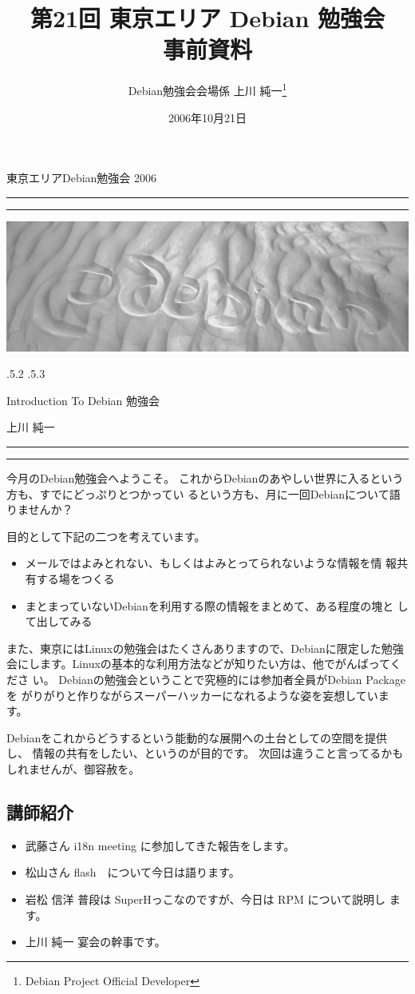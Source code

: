 \documentclass[mingoth,a4paper]{jsarticle}
\makeatletter
\renewcommand{\section}{\@startsection{section}{1}{\z@}%
    {\Cvs \@plus.5\Cdp \@minus.2\Cdp}%
    {.5\Cvs \@plus.3\Cdp}%
    {\normalfont\Huge\headfont\raggedright\centering}} %
\newcommand{\dancersection}[2]{%
\newpage
東京エリアDebian勉強会 2006
\hrule
\vspace{0.5mm}
\hrule
\hfill{}\includegraphics[width=16cm]{image2006-natsu/guruguru-sand-light.png}\\
\vspace{-5cm}
\begin{center}
\section{#1}
\end{center}
\hfill{}\colorbox{white}{#2}\hspace{3cm}\space\\
\vspace{1cm}
\hrule
\vspace{0.5mm}
\hrule
\vspace{1cm}
}
\makeatother
\begin{document}
\begin{titlepage}

\title{
 第21回 東京エリア Debian 勉強会\\事前資料}
\date{2006年10月21日}
\author{Debian勉強会会場係 上川 純一\thanks{Debian Project Official Developer}} 
\maketitle
\thispagestyle{empty}
\end{titlepage}

\newpage
\tableofcontents

\dancersection{Introduction To Debian 勉強会}{上川 純一}

今月のDebian勉強会へようこそ。
これからDebianのあやしい世界に入るという方も、すでにどっぷりとつかってい
るという方も、月に一回Debianについて語りませんか？

目的として下記の二つを考えています。

\begin{itemize}
 \item メールではよみとれない、もしくはよみとってられないような情報を情
       報共有する場をつくる
 \item まとまっていないDebianを利用する際の情報をまとめて、ある程度の塊と
       して出してみる
\end{itemize}

また、東京にはLinuxの勉強会はたくさんありますので、Debianに限定した勉強
会にします。Linuxの基本的な利用方法などが知りたい方は、他でがんばってくださ
い。
Debianの勉強会ということで究極的には参加者全員がDebian Packageを
がりがりと作りながらスーパーハッカーになれるような姿を妄想しています。

Debianをこれからどうするという能動的な展開への土台としての空間を提供し、
情報の共有をしたい、というのが目的です。
次回は違うこと言ってるかもしれませんが、御容赦を。

\subsection{講師紹介}

\begin{itemize}
 \item{武藤さん} i18n meeting に参加してきた報告をします。
 \item{松山さん} flash　について今日は語ります。
 \item{岩松 信洋} 普段は SuperHっこなのですが、今日は RPM について説明し
      ます。
 \item{上川 純一} 宴会の幹事です。
\end{itemize}
\end{document}
